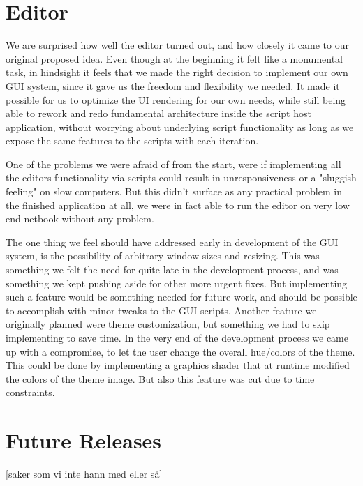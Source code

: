 \section{Editor}
We are surprised how well the editor turned out, and how closely it came to our original proposed idea. Even though at the beginning it felt like a monumental task, in hindsight it feels that we made the right decision to implement our own GUI system, since it gave us the freedom and flexibility we needed. It made it possible for us to optimize the UI rendering for our own needs, while still being able to rework and redo fundamental architecture inside the script host application, without worrying about underlying script functionality as long as we expose the same features to the scripts with each iteration.

One of the problems we were afraid of from the start, were if implementing all the editors functionality via scripts could result in unresponsiveness or a "sluggish feeling" on slow computers. But this didn't surface as any practical problem in the finished application at all, we were in fact able to run the editor on very low end netbook without any problem.

The one thing we feel should have addressed early in development of the GUI system, is the possibility of arbitrary window sizes and resizing. This was something we felt the need for quite late in the development process, and was something we kept pushing aside for other more urgent fixes. But implementing such a feature would be something needed for future work, and should be possible to accomplish with minor tweaks to the GUI scripts. Another feature we originally planned were theme customization, but something we had to skip implementing to save time. In the very end of the development process we came up with a compromise, to let the user change the overall hue/colors of the theme. This could be done by implementing a graphics shader that at runtime modified the colors of the theme image. But also this feature was cut due to time constraints. 



\section{Future Releases}
[saker som vi inte hann med eller så]

